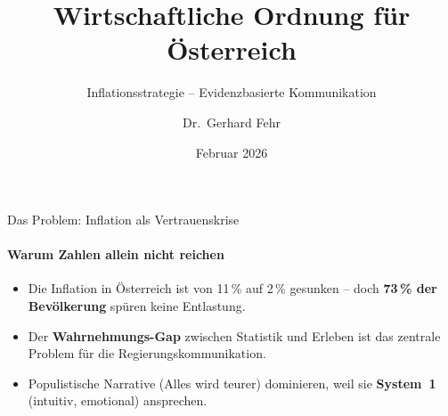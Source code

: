 \documentclass[aspectratio=169, 11pt, xcolor={table}]{beamer}
\title{Wirtschaftliche Ordnung f\"ur \"Osterreich}
\subtitle{Inflationsstrategie -- Evidenzbasierte Kommunikation}
\author{Dr.\ Gerhard Fehr}
\institute{FehrAdvice \& Partners AG}
\date{Februar 2026}
\begin{document}

\begin{frame}[plain]
    \titlepage
\end{frame}


\begin{frame}{Das Problem: Inflation als Vertrauenskrise}
\framesubtitle{Warum Zahlen allein nicht reichen}

\begin{itemize}
    \item Die Inflation in \"Osterreich ist von 11\,\% auf 2\,\% gesunken --
          doch \textbf{73\,\% der Bev\"olkerung} sp\"uren keine Entlastung.
    \item Der \textbf{Wahrnehmungs-Gap} zwischen Statistik und Erleben
          ist das zentrale Problem f\"ur die Regierungskommunikation.
    \item Populistische Narrative (\guillemotleft Alles wird teurer\guillemotright)
          dominieren, weil sie \textbf{System~1} (intuitiv, emotional) ansprechen.
\end{itemize}

\vskip8pt

\end{frame}

\end{document}
